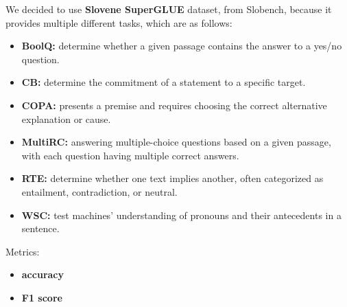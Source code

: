 \documentclass[fleqn,moreauthors,10pt]{ds_report}
\begin{document}
    We decided to use \textbf{Slovene SuperGLUE} dataset, from Slobench, because it provides multiple different tasks, which are as follows:
    \begin{itemize}
        \item \textbf{BoolQ:} determine whether a given passage contains the answer to a yes/no question.
        \item \textbf{CB:} determine the commitment of a statement to a specific target.
        \item \textbf{COPA:} presents a premise and requires choosing the correct alternative explanation or cause.
        \item \textbf{MultiRC:} answering multiple-choice questions based on a given passage, with each question having multiple correct answers.
        \item \textbf{RTE:} determine whether one text implies another, often categorized as entailment, contradiction, or neutral.
        \item \textbf{WSC:} test machines' understanding of pronouns and their antecedents in a sentence.
     \end{itemize}
    
    
    
    Metrics: 
    \begin{itemize}
        \item \textbf{accuracy}
        \item \textbf{F1 score}
     \end{itemize}
\end{document}
